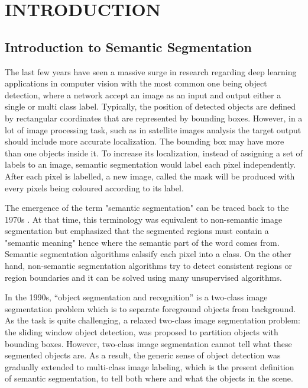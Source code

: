 \chapter{INTRODUCTION}
\section{Introduction to Semantic Segmentation}

The last few years have seen a massive surge in research regarding deep learning applications in computer vision with the most common one being object detection, where a network accept an image as an input and output either a single or multi class label. Typically, the position of detected objects are defined by rectangular coordinates that are represented by bounding boxes. However, in a lot of image processing task, such as in satellite images analysis the target output should include more accurate localization. The bounding box may have more than one objects inside it. To increase its localization, instead of assigning a set of labels to an image, semantic segmentation would label each pixel independently. After each pixel is labelled, a new image, called the mask  will be produced with every pixels being coloured according to its label.

The emergence of the term "semantic segmentation" can be traced back to the 1970s \cite{YU201882}. At that time, this terminology was equivalent to non-semantic image segmentation but emphasized that the segmented regions must contain a "semantic meaning" hence where the semantic part of the word comes from. Semantic segmentation algorithms calssify each pixel into a class. On the other hand, non-semantic segmentation algorithms try to detect consistent regions or region boundaries and it can be solved using many unsupervised algorithms. 

In the 1990s, “object segmentation and recognition” is a two-class image segmentation problem which is to separate foreground objects from background. As the task is quite challenging, a relaxed two-class image segmentation problem: the sliding window object detection, was proposed to partition objects with bounding boxes. However, two-class image segmentation cannot tell what these segmented objects are. As a result, the generic sense of object detection was gradually extended to multi-class image labeling, which is the present definition of semantic segmentation, to tell both where and what the objects in the scene.


